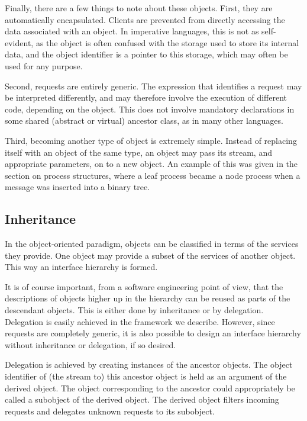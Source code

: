 Finally, there are a few things to note about these objects.  First,
they are automatically encapsulated.  Clients are prevented from
directly accessing the data associated with an object.  In imperative
languages, this is not as self-evident, as the object is often
confused with the storage used to store its internal data, and the
object identifier is a pointer to this storage, which may often be
used for any purpose.

Second, requests are entirely generic.  The expression that identifies
a request may be interpreted differently, and may therefore involve
the execution of different code, depending on the object.  This does
not involve mandatory declarations in some shared (abstract or
virtual) ancestor class, as in many other languages.

Third, becoming another type of object is extremely simple.  Instead of
replacing itself with an object of the same type, an object may pass
its stream, and appropriate parameters, on to a new object.  An example
of this was given in the section on process structures, where a leaf
process became a node process when a message was inserted into a
binary tree.

\subsection{Inheritance}

In the object-oriented paradigm, objects can be classified in terms of
the services they provide.  One object may provide a subset of the
services of another object.  This way an interface hierarchy is formed.

It is of course important, from a software engineering point of view,
that the descriptions of objects higher up in the hierarchy can be
reused as parts of the descendant objects.  This is either done by
inheritance or by delegation.  Delegation is easily achieved in the
framework we describe.  However, since requests are completely
generic, it is also possible to design an interface hierarchy without
inheritance or delegation, if so desired.

Delegation is achieved by creating instances of the ancestor
objects.  The object identifier of (the stream to) this ancestor object
is held as an argument of the derived object.  The object corresponding
to the ancestor could appropriately be called a subobject of the
derived object.  The derived object filters incoming requests and
delegates unknown requests to its subobject.

